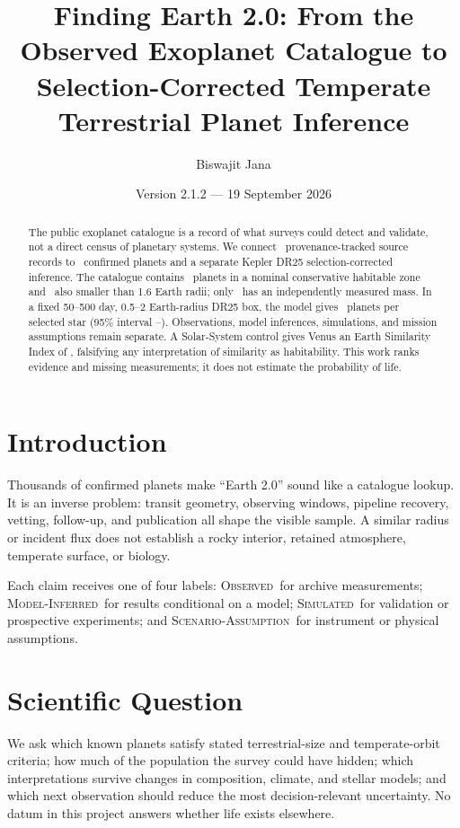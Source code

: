 \documentclass[11pt]{article}
\title{Finding Earth 2.0: From the Observed Exoplanet Catalogue to\\Selection-Corrected Temperate Terrestrial Planet Inference}
\author{Biswajit Jana}
\date{Version 2.1.2 --- 19 September 2026}
\newcommand{\observed}{\textsc{Observed}}
\newcommand{\inferred}{\textsc{Model-Inferred}}
\newcommand{\simulated}{\textsc{Simulated}}
\newcommand{\scenario}{\textsc{Scenario-Assumption}}
\begin{document}
\maketitle
\begin{abstract}
The public exoplanet catalogue is a record of what surveys could detect and
validate, not a direct census of planetary systems. We connect
\TotalSourceRecords\ provenance-tracked source records to \ConfirmedPlanets\
confirmed planets and a separate Kepler DR25 selection-corrected inference.
The catalogue contains \ConservativeHZ\ planets in a nominal conservative
habitable zone and \SmallConservativeHZ\ also smaller than 1.6 Earth radii;
only \SmallHZMeasuredMass\ has an independently measured mass. In a fixed
50--500 day, 0.5--2 Earth-radius DR25 box, the model gives
\OccurrenceMedian\ planets per selected star (95\% interval
\OccurrenceLow--\OccurrenceHigh). Observations, model inferences, simulations,
and mission assumptions remain separate. A Solar-System control gives Venus an
Earth Similarity Index of \VenusESI, falsifying any interpretation of
similarity as habitability. This work ranks evidence and missing measurements;
it does not estimate the probability of life.
\end{abstract}

\section{Introduction}
Thousands of confirmed planets make ``Earth 2.0'' sound like a catalogue
lookup. It is an inverse problem: transit geometry, observing windows, pipeline
recovery, vetting, follow-up, and publication all shape the visible sample. A
similar radius or incident flux does not establish a rocky interior, retained
atmosphere, temperate surface, or biology.

Each claim receives one of four labels: \observed\ for archive measurements;
\inferred\ for results conditional on a model; \simulated\ for validation or
prospective experiments; and \scenario\ for instrument or physical assumptions.

\section{Scientific Question}
We ask which known planets satisfy stated terrestrial-size and temperate-orbit
criteria; how much of the population the survey could have hidden; which
interpretations survive changes in composition, climate, and stellar models;
and which next observation should reduce the most decision-relevant uncertainty.
No datum in this project answers whether life exists elsewhere.
\end{document}
